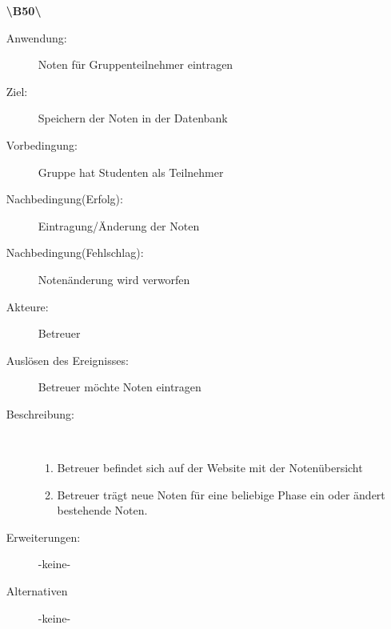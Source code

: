 \documentclass[parskip=full]{scrartcl}
\begin{document}
\begin{enumerate}
  \item[\textbf{\textbackslash B50\textbackslash}] \begin{description}
  	\item[Anwendung:] Noten für Gruppenteilnehmer eintragen
  	\item[Ziel:] Speichern der Noten in der Datenbank
  	\item[Vorbedingung:] Gruppe hat Studenten als Teilnehmer
  	\item[Nachbedingung(Erfolg):] Eintragung/Änderung der Noten
  	\item[Nachbedingung(Fehlschlag):] Notenänderung wird verworfen
  	\item[Akteure:] Betreuer
  	\item[Auslösen des Ereignisses:] Betreuer möchte Noten eintragen
  	\item[Beschreibung:]~
  	\begin{enumerate}[1.]
  	  \item Betreuer befindet sich auf der Website mit der Notenübersicht
  	  \item Betreuer trägt neue Noten für eine beliebige Phase ein oder ändert bestehende Noten.
  	\end{enumerate}
  	\item[Erweiterungen:] -keine-
  	\item[Alternativen] -keine-
  \end{description}
  \pagebreak
\end{enumerate}
\end{document}
